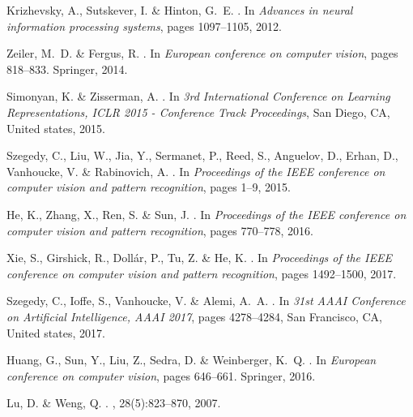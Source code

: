 \documentclass[review]{cvpr}
\begin{document}
{\begin{thebibliography}{10}
Krizhevsky, A., Sutskever, I. \&  Hinton, G.~E.
.
\newblock In {\em Advances in neural information processing systems}, pages
  1097--1105, 2012.


Zeiler, M.~D. \&  Fergus, R.
.
\newblock In {\em European conference on computer vision}, pages 818--833.
  Springer, 2014.


Simonyan, K. \&  Zisserman, A.
.
\newblock In {\em 3rd International Conference on Learning Representations,
  ICLR 2015 - Conference Track Proceedings}, San Diego, CA, United states,
  2015.


Szegedy, C., Liu, W., Jia, Y., Sermanet, P., Reed, S., Anguelov, D., Erhan, D.,
  Vanhoucke, V. \&  Rabinovich, A.
.
\newblock In {\em Proceedings of the IEEE conference on computer vision and
  pattern recognition}, pages 1--9, 2015.


He, K., Zhang, X., Ren, S. \&  Sun, J.
.
\newblock In {\em Proceedings of the IEEE conference on computer vision and
  pattern recognition}, pages 770--778, 2016.


Xie, S., Girshick, R., Doll{\'{a}}r, P., Tu, Z. \&  He, K.
.
\newblock In {\em Proceedings of the IEEE conference on computer vision and
  pattern recognition}, pages 1492--1500, 2017.



Szegedy, C., Ioffe, S., Vanhoucke, V. \&  Alemi, A.~A.
.
\newblock In {\em 31st AAAI Conference on Artificial Intelligence, AAAI 2017},
  pages 4278--4284, San Francisco, CA, United states, 2017.


Huang, G., Sun, Y., Liu, Z., Sedra, D. \&  Weinberger, K.~Q.
.
\newblock In {\em European conference on computer vision}, pages 646--661.
  Springer, 2016.



Lu, D. \&  Weng, Q.
.
, 28(5):823--870, 2007.



\end{thebibliography}}
\end{document}

